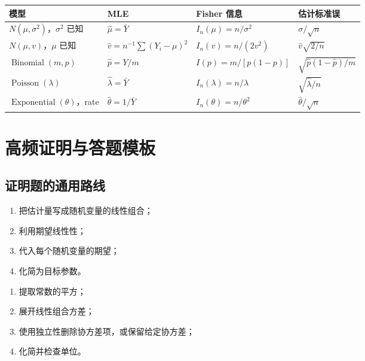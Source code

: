 \documentclass[11pt,a4paper]{article}
\newcommand{\1}{\mathbf{1}}
\begin{document}
\begin{center}
\renewcommand{\arraystretch}{1.35}
\small
\begin{tabularx}{\textwidth}{p{2.5cm}p{3.1cm}p{3.1cm}X}
\toprule
模型 & MLE & Fisher 信息 & 估计标准误\\
\midrule
$N(\mu,\sigma^2)$，$\sigma^2$ 已知
& $\hat\mu=\bar Y$
& $I_n(\mu)=n/\sigma^2$
& $\sigma/\sqrt n$\\
$N(\mu,v)$，$\mu$ 已知
& $\hat v=n^{-1}\sum(Y_i-\mu)^2$
& $I_n(v)=n/(2v^2)$
& $\hat v\sqrt{2/n}$\\
$\operatorname{Binomial}(m,p)$
& $\hat p=Y/m$
& $I(p)=m/[p(1-p)]$
& $\sqrt{\hat p(1-\hat p)/m}$\\
$\operatorname{Poisson}(\lambda)$
& $\hat\lambda=\bar Y$
& $I_n(\lambda)=n/\lambda$
& $\sqrt{\hat\lambda/n}$\\
$\operatorname{Exponential}(\theta)$，rate
& $\hat\theta=1/\bar Y$
& $I_n(\theta)=n/\theta^2$
& $\hat\theta/\sqrt n$\\
\bottomrule
\end{tabularx}
\end{center}

\section{高频证明与答题模板}

\subsection{证明题的通用路线}

\begin{methodbox}[证明估计量无偏]
\begin{enumerate}
  \item 把估计量写成随机变量的线性组合；
  \item 利用期望线性性；
  \item 代入每个随机变量的期望；
  \item 化简为目标参数。
\end{enumerate}
\end{methodbox}

\begin{methodbox}[计算估计量方差]
\begin{enumerate}
  \item 提取常数的平方；
  \item 展开线性组合方差；
  \item 使用独立性删除协方差项，或保留给定协方差；
  \item 化简并检查单位。
\end{enumerate}
\end{methodbox}
\end{document}
